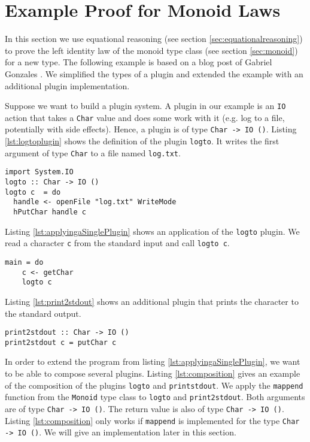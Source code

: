 \section{Example Proof for Monoid Laws}
\label{sec:example}
In this section we use equational reasoning (see section \ref{sec:equationalreasoning}) to prove the left identity law of the monoid type class (see section \ref{sec:monoid}) for a new type.
The following example is based on a blog post of Gabriel Gonzales \cite{gonzales14}. We simplified the types of a plugin and extended the example with an additional plugin implementation.

Suppose we want to build a plugin system. A plugin in our example is an \verb|IO| action that takes a \verb|Char| value and does some work with it (e.g. log to a file, potentially with side effects). Hence, a plugin is of type \verb|Char -> IO ()|. Listing \ref{lst:logtoplugin} shows the definition of the plugin \verb|logto|. It writes the first argument of type \verb|Char| to a file named \verb|log.txt|.

\begin{lstlisting}[caption={Definition of a plugin that writes a character to a file.}, label={lst:logtoplugin}]
import System.IO
logto :: Char -> IO ()
logto c  = do
  handle <- openFile "log.txt" WriteMode
  hPutChar handle c
\end{lstlisting}

Listing \ref{lst:applyingaSinglePlugin} shows an application of the \verb|logto| plugin. We read a character \verb|c| from the standard input and call \verb|logto c|.

\begin{lstlisting}[caption={Calling the {\ttfamily logto} IO action in main}, label={lst:applyingaSinglePlugin}]
main = do
    c <- getChar
    logto c
\end{lstlisting}

Listing \ref{lst:print2stdout} shows an additional plugin that prints the character to the standard output. 

\begin{lstlisting}[caption={Definition of the plugin {\ttfamily print2stdout}}, label={lst:print2stdout}]
print2stdout :: Char -> IO ()
print2stdout c = putChar c
\end{lstlisting}
In order to extend the program from listing \ref{lst:applyingaSinglePlugin}, we want to be able to compose several plugins.
Listing \ref{lst:composition} gives an example of the composition of the plugins \verb|logto| and \verb|printstdout|. We apply the \verb|mappend| function from the \verb|Monoid| type class to \verb|logto| and \verb|print2stdout|. Both arguments are of type \verb|Char -> IO ()|. The return value is also of type \verb|Char -> IO ()|. Listing \ref{lst:composition} only works if \verb|mappend| is implemented for the type \verb|Char -> IO ()|. We will give an implementation later in this section.

